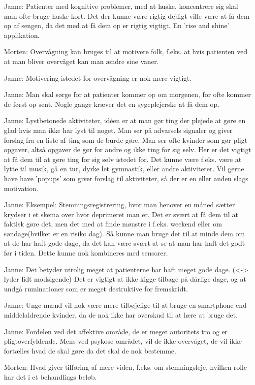 Janne: Patienter med kognitive problemer, med at huske, koncentrere sig skal man ofte bruge huske kort. Det der kunne være rigtig dejligt ville være at få dem op af sengen, da det med at få dem op er rigtig vigtigt. En 'rise and shine' applikation.

Morten: Overvågning kan bruges til at motivere folk, f.eks. at hvis patienten ved at man bliver overvåget kan man ændre sine vaner.

Janne: Motivering istedet for overvågning er nok mere vigtigt.

Janne: Man skal sørge for at patienter kommer op om morgenen, for ofte kommer de først op sent. Nogle gange kræver det en sygeplejerske at få dem op.

Janne: Lystbetonede aktiviteter, idéen er at man gør ting der plejede at gøre en glad hvis man ikke har lyst til noget. Man ser på advarsels signaler og giver forslag fra en liste af ting som de burde gøre. Man ser ofte kvinder som gør pligt-opgaver, altså opgaver de gør for andre og ikke ting for sig selv. Her er det vigtigt at få dem til at gøre ting for sig selv istedet for. Det kunne være f.eks. være at lytte til musik, gå en tur, dyrke let gymnastik, eller andre aktiviteter. Vil gerne have have 'popups' som giver forslag til aktiviteter, så der er en eller anden slags motivation. 

Janne: Eksempel: Stemningsregistrering, hvor man henover en måned sætter krydser i et skema over hvor deprimeret man er. Det er svært at få dem til at faktisk gøre det, men det med at finde mønstre i f.eks. weekend eller om søndage(hvilket er en risiko dag). Så kunne man bruge det til at minde dem om at de har haft gode dage, da det kan være svært at se at man har haft det godt før i tiden. Dette kunne nok kombineres med sensorer. 

Janne: Det betyder utrolig meget at patienterne har haft meget gode dage. (<-> lyder lidt modsigende) Det er vigtigt at ikke kigge tilbage på dårlige dage, og at undgå ruminationer som er meget destruktive for fremskridt.

Janne: Unge mænd vil nok være mere tilbøjelige til at bruge en smartphone end middelaldrende kvinder, da de nok ikke har overskud til at lære at bruge det.

Janne: Fordelen ved det affektive område, de er meget autoritets tro og er pligtoverfyldende. Mens ved psykose området, vil de ikke overvåget, de vil ikke fortælles hvad de skal gøre da det skal de nok bestemme. 

Morten: Hvad giver tilføring af mere viden, f.eks. om stemningsleje, hvilken rolle har det i et behandlings beløb. 

